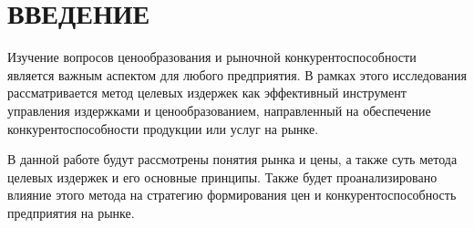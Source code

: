 \chapter*{ВВЕДЕНИЕ}

Изучение вопросов ценообразования и рыночной конкурентоспособности является важным аспектом для любого предприятия. 
В рамках этого исследования рассматривается метод целевых издержек как эффективный инструмент управления издержками и ценообразованием, направленный на обеспечение конкурентоспособности продукции или услуг на рынке. 

В данной работе будут рассмотрены понятия рынка и цены, а также суть метода целевых издержек и его основные принципы.
Также будет проанализировано влияние этого метода на стратегию формирования цен и конкурентоспособность предприятия на рынке.
